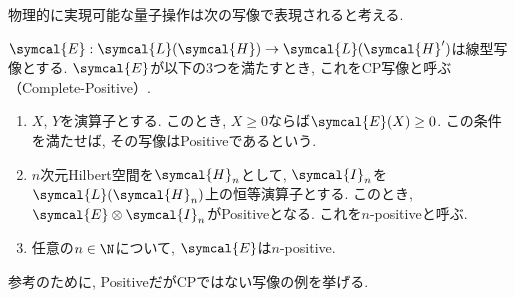 

物理的に実現可能な量子操作は次の写像で表現されると考える. 

\begin{mydfn}[CP写像]\label{dfn.CP-map}
  $\symcal{E}:\symcal{L}(\symcal{H})\to\symcal{L}(\symcal{H}')$は線型写像とする. 
  $\symcal{E}$が以下の3つを満たすとき, これをCP写像と呼ぶ（Complete-Positive）. 
  \begin{enumerate}
    \item $X$, $Y$を演算子とする. 
    このとき, $X\geq 0$ならば$\symcal{E}(X)\geq 0$. 
    この条件を満たせば, その写像はPositiveであるという. 
    \item $n$次元Hilbert空間を$\symcal{H}_n$として, $\symcal{I}_n$を$\symcal{L}(\symcal{H}_n)$上の恒等演算子とする. 
    このとき, $\symcal{E}\otimes \symcal{I}_n$がPositiveとなる. 
    これを$n$-positiveと呼ぶ. 
    \item 任意の$n\in \N$について, $\symcal{E}$は$n$-positive. 
  \end{enumerate}
\end{mydfn}

参考のために, PositiveだがCPではない写像の例を挙げる. 


